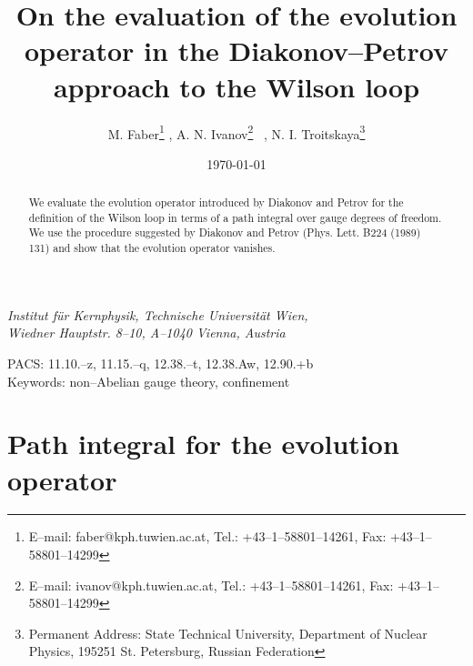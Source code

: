 \documentclass[a4paper,11pt]{article}
\begin{document}
\title{On the evaluation of the evolution operator \coordHE{} in the Diakonov--Petrov approach to the Wilson
loop}

\author{M. Faber\thanks{E--mail: faber@kph.tuwien.ac.at, Tel.:
+43--1--58801--14261, Fax: +43--1--58801--14299} ,
A. N. Ivanov\thanks{E--mail: ivanov@kph.tuwien.ac.at, Tel.:
+43--1--58801--14261, Fax: +43--1--58801--14299}~\myHighlight{$^{\ddagger}$}\coordHE{} , N. I.
Troitskaya\thanks{Permanent Address: State
Technical University, Department of Nuclear Physics, 195251
St. Petersburg, Russian Federation}}

\date{\today}

\maketitle

\begin{center}
{\it Institut f\"ur Kernphysik, Technische Universit\"at Wien, \\ 
Wiedner Hauptstr. 8--10, A--1040 Vienna, Austria}
\end{center}

\begin{abstract}
We evaluate the evolution operator \coordHE{} introduced
by Diakonov and Petrov for the definition of the Wilson loop in terms
of a path integral over gauge degrees of freedom. We use the procedure
suggested by Diakonov and Petrov (Phys. Lett. B224 (1989) 131) and
show that the evolution operator vanishes.
\end{abstract}

\begin{center}
PACS: 11.10.--z, 11.15.--q, 12.38.--t, 12.38.Aw, 12.90.+b\\ 
Keywords: non--Abelian gauge theory, confinement
\end{center}



\section*{Path integral for the evolution operator \coordHE{} } 
\setcounter{equation}{0}
\end{document}
